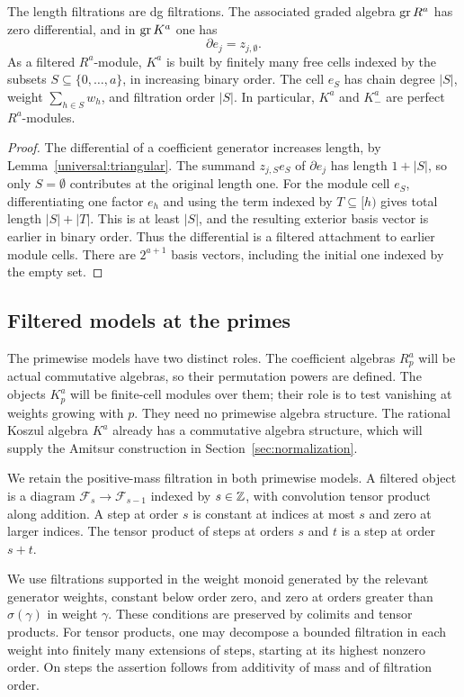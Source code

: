 \begin{lemma}\label{universal:filtered-cells}
The length filtrations are dg filtrations. The associated graded
algebra $\operatorname{gr} R^a$ has zero differential, and in $\operatorname{gr} K^a$ one has
\[
 \partial e_j=z_{j,\emptyset}.
\]
As a filtered $R^a$-module, $K^a$ is built by finitely many free
cells indexed by the subsets $S\subseteq\{0,\ldots,a\}$, in
increasing binary order. The cell $e_S$ has chain degree $|S|$,
weight $\sum_{h\in S}w_h$, and filtration order $|S|$.
In particular, $K^a$ and $K_-^a$ are perfect $R^a$-modules.
\end{lemma}

\begin{proof}
The differential of a coefficient generator increases length,
by Lemma~\ref{universal:triangular}. The summand
$z_{j,S}e_S$ of $\partial e_j$ has length $1+|S|$, so only
$S=\emptyset$ contributes at the original length one.
For the module cell $e_S$, differentiating one factor $e_h$
and using the term indexed by $T\subseteq[h)$ gives total length
$|S|+|T|$. This is at least $|S|$, and the resulting exterior
basis vector is earlier in binary order. Thus the differential
is a filtered attachment to earlier module cells. There are
$2^{a+1}$ basis vectors, including the initial one indexed by
the empty set.
\end{proof}

\subsection{Filtered models at the primes}

The primewise models have two distinct roles. The coefficient algebras
$R_p^a$ will be actual commutative algebras, so their permutation powers
are defined. The objects $K_p^a$ will be finite-cell modules over them;
their role is to test vanishing at weights growing with $p$. They need
no primewise algebra structure. The rational Koszul algebra $K^a$
already has a commutative algebra structure, which will supply the
Amitsur construction in Section~\ref{sec:normalization}.

We retain the positive-mass filtration in both primewise models.
A filtered object is a diagram
$\mathcal F_s\to\mathcal F_{s-1}$ indexed by $s\in\mathbb Z$, with
convolution tensor product along addition. A step at order $s$
is constant at indices at most $s$ and zero at larger indices.
The tensor product of steps at orders $s$ and $t$ is a step at
order $s+t$.

We use filtrations supported in the weight monoid generated by
the relevant generator weights, constant below order zero,
and zero at orders greater than $\sigma(\gamma)$ in weight
$\gamma$. These conditions are preserved by colimits and tensor
products. For tensor products, one may decompose a bounded
filtration in each weight into finitely many extensions of
steps, starting at its highest nonzero order. On steps the
assertion follows from additivity of mass and of filtration order.

